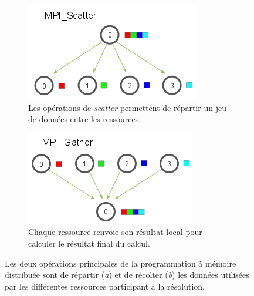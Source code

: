         
            \begin{figure}[t!]
                \centering
                \begin{subfigure}[t]{0.48\textwidth}
                    \centering
                    \includegraphics[width=.8\linewidth]{images/scatter.png}
                    \caption{\label{fig:scatter}Les opérations de \textit{scatter} permettent de répartir un jeu de données entre les ressources.}
                \end{subfigure}\hfill
            \begin{subfigure}[t]{0.48\textwidth}
                    \centering
                    \includegraphics[width=.8\linewidth]{images/gather.png}
                    \caption{\label{fig:gather}Chaque ressource renvoie son résultat local pour calculer le résultat final du calcul.}
                \end{subfigure}
                \caption{\label{fig:scatter_gather}Les deux opérations principales de la programmation à mémoire distribuée sont de répartir (\textit{a}) et de récolter (\textit{b}) les données utilisées par les différentes ressources participant à la résolution\protect\footnotemark.}
            \end{figure}
               
